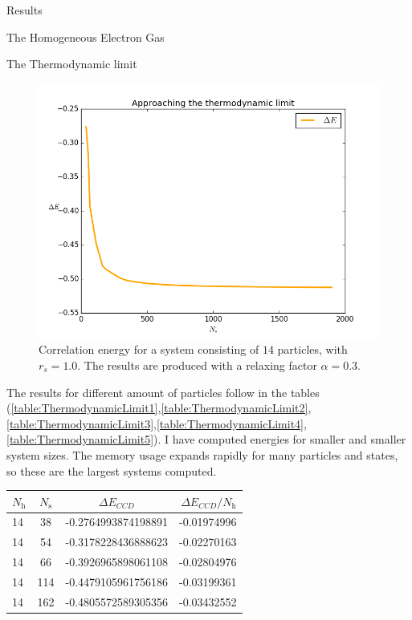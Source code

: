 \documentclass[twoside,english]{uiofysmaster}
\begin{document}
\begin{chapter}{Results}
\begin{section}{The Homogeneous Electron Gas}
\begin{subsection}{The Thermodynamic limit}
			\begin{figure}[H]
				\includegraphics[width=\textwidth]{../ElectronGas/Results/Figures/Thermodynamic_limit.png}
				\caption{Correlation energy for a system consisting of $14$ particles, with $r_s=1.0$. The results are produced with a relaxing factor $\alpha=0.3$. }
				\label{figure:thermodynamic_limit}
			\end{figure}
			The results for different amount of particles follow in the tables \newline (\ref{table:ThermodynamicLimit1},\ref{table:ThermodynamicLimit2},\ref{table:ThermodynamicLimit3},\ref{table:ThermodynamicLimit4},\ref{table:ThermodynamicLimit5}). I have computed energies for smaller and smaller system sizes. The memory usage expands rapidly for many particles and states, so these are the largest systems computed. 
			\begin{table}[H]
				\begin{center}
					\begin{tabular}[center]{l  c  c r}
						$N_{\text{h}}$ & $N_{\text{s}}$ & $\Delta E_{CCD}$ & $\Delta E_{CCD}/N_{\text{h}}$ \\
						\hline
						14 &  38 & -0.2764993874198891 & -0.01974996 \\
						14 &  54 & -0.3178228436888623 & -0.02270163\\ 
						14 &  66 & -0.3926965898061108 & -0.02804976\\
						14 & 114 & -0.4479105961756186 & -0.03199361 \\
						14 & 162 & -0.4805572589305356 & -0.03432552\\

\end{tabular}
\end{center}
\end{table}
\end{subsection}
\end{section}
\end{chapter}
\end{document}
